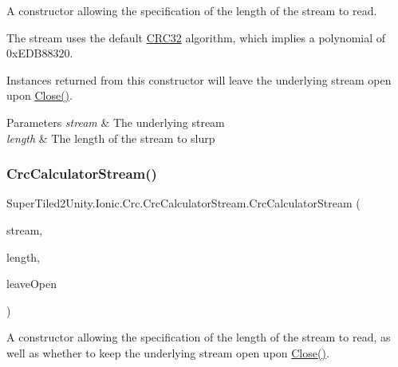 A constructor allowing the specification of the length of the stream to read. 

The stream uses the default \mbox{\hyperlink{class_super_tiled2_unity_1_1_ionic_1_1_crc_1_1_c_r_c32}{C\+R\+C32}} algorithm, which implies a polynomial of 0x\+E\+D\+B88320. 

Instances returned from this constructor will leave the underlying stream open upon \mbox{\hyperlink{class_super_tiled2_unity_1_1_ionic_1_1_crc_1_1_crc_calculator_stream_af4509c6b2480109b3b52f3881b5a8f5f}{Close()}}. 


\begin{DoxyParams}{Parameters}
{\em stream} & The underlying stream\\
\hline
{\em length} & The length of the stream to slurp\\
\hline
\end{DoxyParams}
\mbox{\label{class_super_tiled2_unity_1_1_ionic_1_1_crc_1_1_crc_calculator_stream_aafb4e4ec8f06aa21aa7ace5f2d254d79}} 
\subsubsection{\texorpdfstring{Crc\+Calculator\+Stream()}{CrcCalculatorStream()}\hspace{0.1cm}{\footnotesize\ttfamily [4/5]}}
{\footnotesize\ttfamily Super\+Tiled2\+Unity.\+Ionic.\+Crc.\+Crc\+Calculator\+Stream.\+Crc\+Calculator\+Stream (\begin{DoxyParamCaption}\item[{System.\+I\+O.\+Stream}]{stream,  }\item[{Int64}]{length,  }\item[{bool}]{leave\+Open }\end{DoxyParamCaption})}



A constructor allowing the specification of the length of the stream to read, as well as whether to keep the underlying stream open upon \mbox{\hyperlink{class_super_tiled2_unity_1_1_ionic_1_1_crc_1_1_crc_calculator_stream_af4509c6b2480109b3b52f3881b5a8f5f}{Close()}}. 

